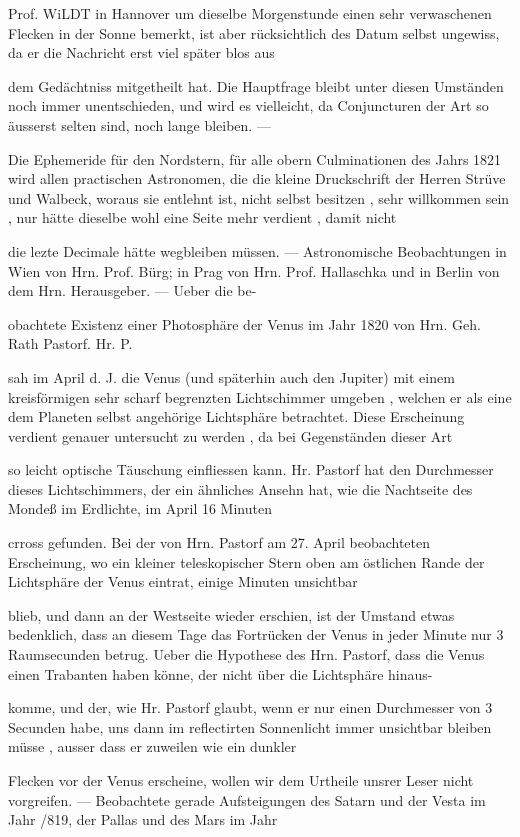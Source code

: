 \documentclass[10pt,a4paper]{article}
\begin{document}
Prof. WiLDT in Hannover um dieselbe Morgenstunde einen sehr verwaschenen Flecken in der Sonne bemerkt, ist aber rücksichtlich des Datum selbst ungewiss, da er die Nachricht erst viel später blos aus

dem Gedächtniss mitgetheilt hat. Die Hauptfrage bleibt unter diesen Umständen noch immer unentschieden, und wird es vielleicht, da Conjuncturen der Art so äusserst selten sind, noch lange bleiben. —

Die Ephemeride für den Nordstern, für alle obern Culminationen des Jahrs 1821 wird allen practischen Astronomen, die die kleine Druckschrift der Herren Strüve und Walbeck, woraus sie entlehnt ist, nicht selbst besitzen , sehr willkommen sein , nur hätte dieselbe wohl eine Seite mehr verdient , damit nicht

die lezte Decimale hätte wegbleiben müssen. — Astronomische Beobachtungen in Wien von Hrn. Prof. Bürg; in Prag von Hrn. Prof. Hallaschka und in Berlin von dem Hrn. Herausgeber. — Ueber die be-

obachtete Existenz einer Photosphäre der Venus im Jahr 1820 von Hrn. Geh. Rath Pastorf. Hr. P.

sah im April d. J. die Venus (und späterhin auch den Jupiter) mit einem kreisförmigen sehr scharf begrenzten Lichtschimmer umgeben , welchen er als eine dem Planeten selbst angehörige Lichtsphäre betrachtet. Diese Erscheinung verdient genauer untersucht zu werden , da bei Gegenständen dieser Art

so leicht optische Täuschung einfliessen kann. Hr. Pastorf hat den Durchmesser dieses Lichtschimmers, der ein ähnliches Ansehn hat, wie die Nachtseite des Mondeß im Erdlichte, im April 16 Minuten

crross gefunden. Bei der von Hrn. Pastorf am 27. April beobachteten Erscheinung, wo ein kleiner teleskopischer Stern oben am östlichen Rande der Lichtsphäre der Venus eintrat, einige Minuten unsichtbar

blieb, und dann an der Westseite wieder erschien, ist der Umstand etwas bedenklich, dass an diesem Tage das Fortrücken der Venus in jeder Minute nur 3 Raumsecunden betrug. Ueber die Hypothese des Hrn. Pastorf, dass die Venus einen Trabanten haben könne, der nicht über die Lichtsphäre hinaus-

komme, und der, wie Hr. Pastorf glaubt, wenn er nur einen Durchmesser von 3 Secunden habe, uns dann im reflectirten Sonnenlicht immer unsichtbar bleiben müsse , ausser dass er zuweilen wie ein dunkler

Flecken vor der Venus erscheine, wollen wir dem Urtheile unsrer Leser nicht vorgreifen. — Beobachtete gerade Aufsteigungen des Satarn und der Vesta im Jahr /819, der Pallas und des Mars im Jahr
\end{document}
